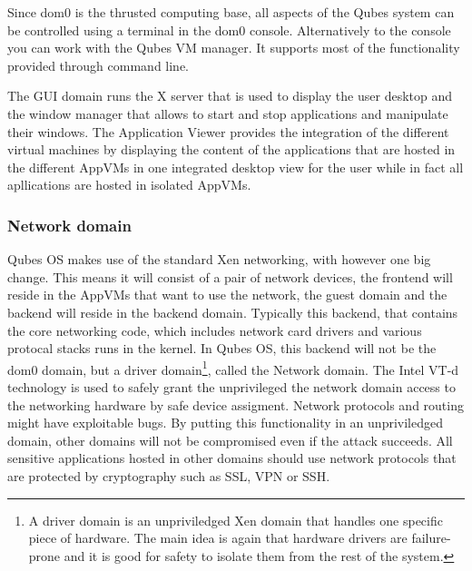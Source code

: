 \documentclass[runningheads,a4paper]{article}
\begin{document}
Since dom0 is the thrusted computing base, all aspects of the Qubes
system can be controlled using a terminal in the dom0 console. 
Alternatively to the console you can work with the Qubes VM
manager. It supports most of the functionality provided through
command line. 

The GUI domain runs the X server that is used to display the user desktop and
the window manager that allows to start and stop applications and
manipulate their windows. The Application Viewer provides the
integration of the different virtual machines by displaying the
content of the applications that are hosted in the
different AppVMs in one integrated desktop view for
the user while in fact all apllications are hosted in isolated AppVMs.


\subsubsection{Network domain}

Qubes OS makes use of the standard Xen networking, with however one
big change. This means it will consist of a pair of network devices,
the frontend will reside in the AppVMs that want to use the network, the
guest domain and the backend will reside in the backend
domain. Typically this backend, that contains the core networking
code, which includes network card drivers and various protocal stacks
runs in the kernel. In Qubes OS, this backend will not be the dom0
domain, but a driver domain\footnote{A driver domain is an
unpriviledged Xen domain that handles one specific piece of
hardware. The main idea is again that hardware drivers are
failure-prone and it is good for safety to isolate them from the rest
of the system.}, called the Network domain. The Intel VT-d technology
is used to safely grant the unprivileged the network domain access to
the networking hardware by safe device assigment. Network protocols
and routing might have exploitable bugs. By putting this functionality
in an unpriviledged domain, other domains will not be compromised even
if the attack succeeds. All sensitive applications hosted in other
domains should use network protocols that are protected by
cryptography such as SSL, VPN or SSH.
\end{document}
